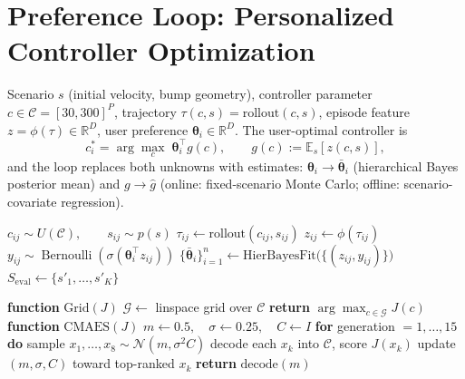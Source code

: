 \documentclass[letterpaper,journal]{IEEEtran}
\newcommand{\Bern}{\operatorname{Bernoulli}}
\newcommand{\E}{\mathbb{E}}
\begin{document}
\section*{Preference Loop: Personalized Controller Optimization}

Scenario $s$ (initial velocity, bump geometry), controller parameter
$c \in \mathcal{C} = [30, 300]^P$, trajectory $\tau(c, s) = \mathrm{rollout}(c, s)$,
episode feature $z = \phi(\tau) \in \mathbb{R}^D$, user preference
$\bm\theta_i \in \mathbb{R}^D$. The user-optimal controller is
\begin{equation*}
  c_i^{*} = \arg\max_{c}\; \bm\theta_i^{\top} g(c),
  \qquad
  g(c) := \E_{s}\!\left[ z(c, s) \right],
\end{equation*}
and the loop replaces both unknowns with estimates:
$\bm\theta_i \to \bar{\bm\theta}_i$ (hierarchical Bayes posterior mean) and
$g \to \hat g$ (online: fixed-scenario Monte Carlo; offline: scenario-covariate
regression).

\begin{algorithm}[H]
\caption{Preference data generation and reward estimation}
\label{alg:data}
\begin{algorithmic}[1]
    \STATE $c_{ij} \sim U(\mathcal{C}), \qquad s_{ij} \sim p(s)$
    \STATE $\tau_{ij} \leftarrow \mathrm{rollout}(c_{ij}, s_{ij})$
    \STATE $z_{ij} \leftarrow \phi(\tau_{ij})$
    \STATE $y_{ij} \sim \Bern\!\left(\sigma(\bm\theta_i^{\top} z_{ij})\right)$
  \ENDFOR
\ENDFOR
\STATE $\{\bar{\bm\theta}_i\}_{i=1}^{n} \leftarrow
       \mathrm{HierBayesFit}\big(\{(z_{ij}, y_{ij})\}\big)$
\STATE $S_{\mathrm{eval}} \leftarrow \{s'_1, \dots, s'_K\}$
\end{algorithmic}
\end{algorithm}

\begin{algorithm}[H]
\caption{Search subroutines (return a maximizer of $J$)}
\label{alg:search}
\begin{algorithmic}[1]
\STATE \textbf{function} $\mathrm{Grid}(J)$
\STATE \quad $\mathcal{G} \leftarrow$ linspace grid over $\mathcal{C}$
\STATE \quad \textbf{return} $\arg\max_{c \in \mathcal{G}} J(c)$
\STATE
\STATE \textbf{function} $\mathrm{CMAES}(J)$
\STATE \quad $m \leftarrow 0.5, \quad \sigma \leftarrow 0.25, \quad C \leftarrow I$
\STATE \quad \textbf{for} generation $= 1, \dots, 15$ \textbf{do}
\STATE \quad\quad sample $x_1, \dots, x_8 \sim \mathcal{N}(m, \sigma^2 C)$
\STATE \quad\quad decode each $x_k$ into $\mathcal{C}$, score $J(x_k)$
\STATE \quad\quad update $(m, \sigma, C)$ toward top-ranked $x_k$
\STATE \quad \textbf{return} $\mathrm{decode}(m)$
\end{algorithmic}
\end{algorithm}
\end{document}
